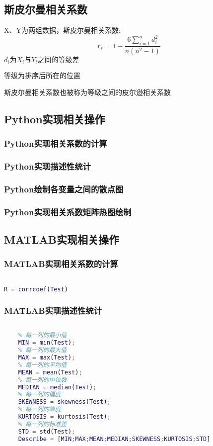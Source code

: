 \documentclass{article}
\begin{document}
\subsection{斯皮尔曼相关系数}
X、Y为两组数据，斯皮尔曼相关系数:
$$
r_s=1-\frac{6\sum_{i=1}^n{d_{i}^{2}}}{n\left( n^2-1 \right)}
$$
$d_{i}为X_{i}与Y_{i}之间的等级差$

等级为排序后所在的位置

斯皮尔曼相关系数也被称为等级之间的皮尔逊相关系数

\subsection{Python实现相关操作}


\subsubsection{Python实现相关系数的计算}


\subsubsection{Python实现描述性统计}


\subsubsection{Python绘制各变量之间的散点图}


\subsubsection{Python实现相关系数矩阵热图绘制}


\subsection{MATLAB实现相关操作}
\subsubsection{MATLAB实现相关系数的计算}
\begin{lstlisting}[language=Matlab]

R = corrcoef(Test)

\end{lstlisting} 

\subsubsection{MATLAB实现描述性统计}
\begin{lstlisting}[language=Matlab]
    
    % 每一列的最小值
    MIN = min(Test);  
    % 每一列的最大值
    MAX = max(Test);   
    % 每一列的平均值
    MEAN = mean(Test);  
    % 每一列的中位数
    MEDIAN = median(Test);  
    % 每一列的偏度
    SKEWNESS = skewness(Test); 
    % 每一列的峰度
    KURTOSIS = kurtosis(Test); 
    % 每一列的标准差
    STD = std(Test);  
    Describe = [MIN;MAX;MEAN;MEDIAN;SKEWNESS;KURTOSIS;STD]  
    
\end{lstlisting} 
\end{document}

